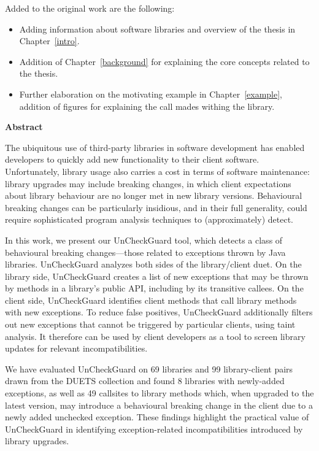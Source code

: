 Added to the original work are the following:

\begin{itemize}
  \item Adding information about software libraries and overview of the thesis in Chapter~\ref{intro}.
  \item Addition of Chapter~\ref{background} for explaining the core concepts related to the thesis.
  \item Further elaboration on the motivating example in Chapter~\ref{example}, addition of figures for explaining the call mades withing the library.
\end{itemize}

\cleardoublepage
{}    %

\begin{center}\textbf{Abstract}\end{center}

      The ubiquitous use of third-party libraries in software development has enabled developers to quickly add
      new functionality to their client software. Unfortunately, library usage also carries a cost in
      terms of software maintenance: library upgrades may include breaking changes, in which client expectations
      about library behaviour are no longer met in new library versions. Behavioural breaking
      changes can be particularly insidious, and in their full generality, could require sophisticated program
      analysis techniques to (approximately) detect.

      In this work, we present our UnCheckGuard tool, which detects a class of behavioural breaking changes---those
      related to exceptions thrown by Java libraries. UnCheckGuard analyzes both sides of the library/client
      duet. On the library side, UnCheckGuard creates a list of new exceptions that may be thrown by methods
      in a library's public API, including by its transitive callees. On the client side, UnCheckGuard identifies
      client methods that call library methods with new exceptions. To reduce false positives, UnCheckGuard
      additionally filters out new exceptions that cannot be triggered by particular clients, using taint analysis. It therefore can be
      used by client developers as a tool to screen library updates for relevant incompatibilities.

      We have evaluated UnCheckGuard on 69 libraries and 99 library-client pairs drawn from the DUETS collection
      and found 8 libraries with newly-added exceptions, as well as 49 callsites to library methods which,
      when upgraded to the latest version, may introduce
      a behavioural breaking change in the client due to a newly added unchecked exception. These findings
      highlight the practical value of UnCheckGuard in identifying exception-related incompatibilities
      introduced by library upgrades.

